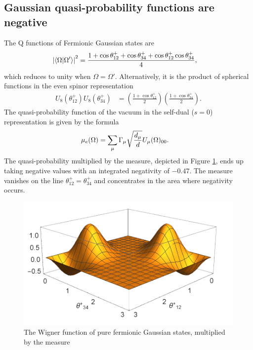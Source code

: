 \subsection{Gaussian quasi-probability functions are negative}
The Q functions of Fermionic Gaussian states are
\begin{align}
\left| \braket{\Omega | \Omega'} \right|^2 &= \frac{1 + \cos\theta^+_{12} + \cos\theta^+_{34} + \cos\theta^+_{12}\cos\theta^+_{34}}{4},
\end{align}
which reduces to unity when $\Omega = \Omega'$. Alternatively, it is the product of spherical functions in the even spinor representation
\begin{align}
	U_8 (\theta_{12}^+) U_8 (\theta_{34}^+) &= \left( \frac{1 + \cos \theta_{12}^+}{2} \right) \left( \frac{1 + \cos \theta_{34}^+}{2} \right).
\end{align}
The quasi-probability function of the vacuum in the self-dual ($s=0$) representation is given by the formula
\begin{align}\label{brif-mann-wigner}
\mu_e (\Omega) &= \sum_{\mu} \Gamma_{\mu} \sqrt{ \frac{d_{\mu}}{d}} \rep_{\mu}(\Omega)_{00}.
\end{align}
The quasi-probability multiplied by the measure, depicted in Figure \ref{fig:wigner}, ends up taking negative values with an integrated negativity of $-0.47$. The measure vanishes on the line $\theta_{12}^+ = \theta_{34}^+$ and concentrates in the area where negativity occurs.
\begin{figure}[t]
	\begin{center}
	\includegraphics[scale=0.7]{img/SO-8-wigner.png}
	\caption{The Wigner function of pure fermionic Gaussian
		states, multiplied by the measure}
	\label{fig:wigner}
	\end{center}
\end{figure}

